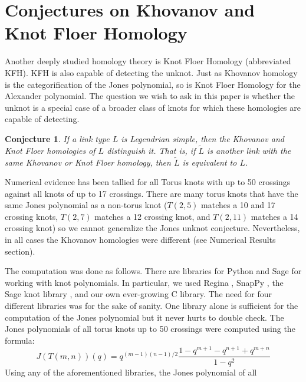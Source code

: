 \documentclass{article}
\theoremstyle{plain}
\newtheorem{conjecture}{Conjecture}
\begin{document}
    \section{Conjectures on Khovanov and Knot Floer Homology}
        Another deeply studied homology theory is Knot Floer Homology
        (abbreviated KFH). KFH is also capable of detecting the unknot. Just as
        Khovanov homology is the categorification of the Jones polynomial, so
        is Knot Floer Homology for the Alexander polynomial.
        The question we wish to ask in this paper is whether the unknot is
        a special case of a broader class of knots for which these homologies
        are capable of detecting.
        \begin{conjecture}
            If a link type $L$ is Legendrian simple, then the Khovanov and Knot
            Floer homologies of $L$ distinguish it. That is, if $\tilde{L}$
            is another link with the same Khovanov or Knot Floer homology,
            then $\tilde{L}$ is equivalent to $L$.
        \end{conjecture}
        Numerical evidence has been tallied for all Torus knots with up to 50
        crossings against all knots of up to 17 crossings. There are many
        torus knots that have the same Jones polynomial as a non-torus knot
        ($T(2,5)$ matches a 10 and 17 crossing knots, $T(2,7)$
        matches a 12 crossing knot, and $T(2,11)$ matches a 14 crossing knot)
        so we cannot generalize the Jones unknot conjecture. Nevertheless, in
        all cases the Khovanov homologies were different
        (see Numerical Results section).
        \par\hfill\par
        The computation was done as follows. There are libraries for Python and
        Sage for working with knot polynomials. In particular, we used
        Regina \cite{regina}, SnapPy \cite{SnapPy}, the Sage knot library
        \cite{sage}, and our own ever-growing C library. The need for four
        different libraries was for the sake of sanity. One library alone is
        sufficient for the computation of the Jones polynomial but it never
        hurts to double check. The Jones polynomials of all torus knots up to
        50 crossings were computed using the formula:
        \begin{equation}
            J(T(m,n))(q)=q^{(m-1)(n-1)/2}
                \frac{1-q^{m+1}-q^{n+1}+q^{m+n}}{1-q^{2}}
        \end{equation}
        Using any of the aforementioned libraries, the Jones polynomial of all
\end{document}
